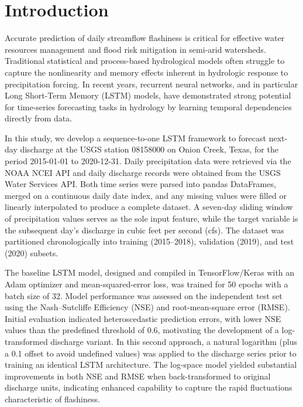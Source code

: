 \documentclass[preprint,12pt]{elsarticle}
\begin{document}
\section{Introduction}

Accurate prediction of daily streamflow flashiness is critical for effective water resources management and flood risk mitigation in semi-arid watersheds. Traditional statistical and process-based hydrological models often struggle to capture the nonlinearity and memory effects inherent in hydrologic response to precipitation forcing. In recent years, recurrent neural networks, and in particular Long Short-Term Memory (LSTM) models, have demonstrated strong potential for time-series forecasting tasks in hydrology by learning temporal dependencies directly from data.

In this study, we develop a sequence-to-one LSTM framework to forecast next-day discharge at the USGS station 08158000 on Onion Creek, Texas, for the period 2015-01-01 to 2020-12-31. Daily precipitation data were retrieved via the NOAA NCEI API and daily discharge records were obtained from the USGS Water Services API. Both time series were parsed into pandas DataFrames, merged on a continuous daily date index, and any missing values were filled or linearly interpolated to produce a complete dataset. A seven-day sliding window of precipitation values serves as the sole input feature, while the target variable is the subsequent day's discharge in cubic feet per second (cfs). The dataset was partitioned chronologically into training (2015--2018), validation (2019), and test (2020) subsets.

The baseline LSTM model, designed and compiled in TensorFlow/Keras with an Adam optimizer and mean-squared-error loss, was trained for 50 epochs with a batch size of 32. Model performance was assessed on the independent test set using the Nash--Sutcliffe Efficiency (NSE) and root-mean-square error (RMSE). Initial evaluation indicated heteroscedastic prediction errors, with lower NSE values than the predefined threshold of 0.6, motivating the development of a log-transformed discharge variant. In this second approach, a natural logarithm (plus a 0.1 offset to avoid undefined values) was applied to the discharge series prior to training an identical LSTM architecture. The log-space model yielded substantial improvements in both NSE and RMSE when back-transformed to original discharge units, indicating enhanced capability to capture the rapid fluctuations characteristic of flashiness.
\end{document}
